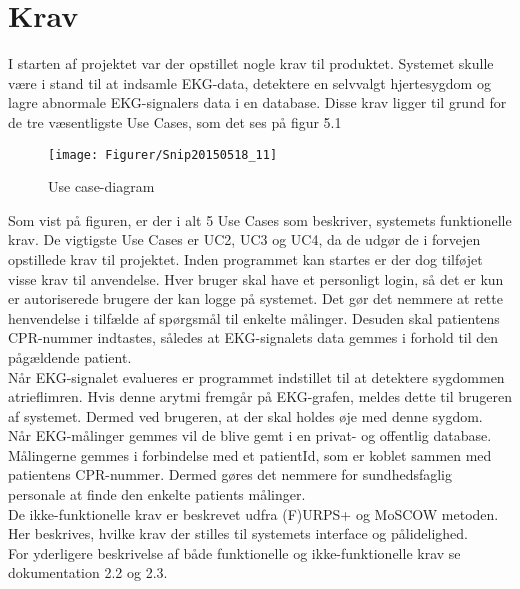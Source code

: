 \chapter{Krav}
I starten af projektet var der opstillet nogle krav til produktet. Systemet skulle være i stand til at indsamle EKG-data, detektere en selvvalgt hjertesygdom og lagre abnormale EKG-signalers data i en database. Disse krav ligger til grund for de tre væsentligste Use Cases, som det ses på figur 5.1

\begin{figure}[H]
	\centering
	\texttt{[image: Figurer/Snip20150518\_11]}
	\caption{Use case-diagram}
	\label{fig:Use Cases}
\end{figure}

Som vist på figuren, er der i alt 5 Use Cases som beskriver, systemets funktionelle krav. De vigtigste Use Cases er UC2, UC3 og UC4, da de udgør de i forvejen opstillede krav til projektet. Inden programmet kan startes er der dog tilføjet visse krav til anvendelse. Hver bruger skal have et personligt login, så det er kun er autoriserede brugere der kan logge på systemet. Det gør det nemmere at rette henvendelse i tilfælde af spørgsmål til enkelte målinger. Desuden skal patientens CPR-nummer indtastes, således at EKG-signalets data gemmes i forhold til den pågældende patient.\\
Når EKG-signalet evalueres er programmet indstillet til at detektere sygdommen atrieflimren. Hvis denne arytmi fremgår på EKG-grafen, meldes dette til brugeren af systemet. Dermed ved brugeren, at der skal holdes øje med denne sygdom.\\
Når EKG-målinger gemmes vil de blive gemt i en privat- og offentlig database. Målingerne gemmes i forbindelse med et patientId, som er koblet sammen med patientens CPR-nummer. Dermed gøres det nemmere for sundhedsfaglig personale at finde den enkelte patients målinger.\\
De ikke-funktionelle krav er beskrevet udfra (F)URPS+ og MoSCOW metoden. Her beskrives, hvilke krav der stilles til systemets interface og pålidelighed.\\
For yderligere beskrivelse af både funktionelle og ikke-funktionelle krav se dokumentation 2.2 og 2.3.\\
 
